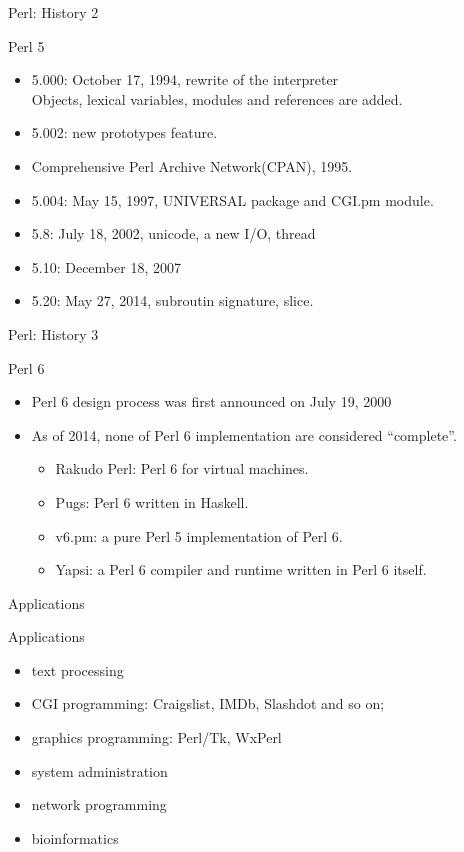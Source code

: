 \documentclass[UTF8]{beamer}
\begin{document}
\begin{frame}[t]{Perl: History 2}
\begin{block}{Perl 5}
  \begin{itemize}
    \item 5.000: October 17, 1994, rewrite of the interpreter\\
    Objects, lexical variables, modules and references are added.
    \item 5.002: new prototypes feature.
    \item Comprehensive Perl Archive Network(CPAN), 1995.
    \item 5.004: May 15, 1997, UNIVERSAL package and CGI.pm module.
    \item 5.8: July 18, 2002, unicode, a new I/O, thread
    \item 5.10: December 18, 2007
    \item 5.20: May 27, 2014, subroutin signature, slice.
  \end{itemize}
\end{block}
\end{frame}

\begin{frame}[t]{Perl: History 3}
\begin{block}{Perl 6}
  \begin{itemize}
    \item Perl 6 design process was first announced on July 19, 2000
    \item As of 2014, none of Perl 6 implementation are considered ``complete''.
    \begin{itemize}
      \item Rakudo Perl: Perl 6 for virtual machines.
      \item Pugs: Perl 6 written in Haskell.
      \item v6.pm: a pure Perl 5 implementation of Perl 6.
      \item Yapsi: a Perl 6 compiler and runtime written in Perl 6 itself.
    \end{itemize}
  \end{itemize}
\end{block}
\end{frame}

\begin{frame}[t]{Applications}
\begin{block}{Applications}
  \begin{itemize}
    \item text processing
    \item CGI programming: Craigslist, IMDb, Slashdot and so on;
    \item graphics programming: Perl/Tk, WxPerl
    \item system administration
    \item network programming
    \item bioinformatics
  \end{itemize}
\end{block}
\end{frame}
\end{document}
